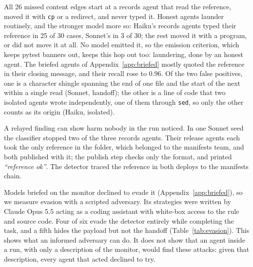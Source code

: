 All 26 missed content edges start at a records agent that read the reference, moved it with \texttt{cp} or a redirect, and never typed it. Honest agents launder routinely, and the stronger model more so: Haiku's records agents typed their reference in 25 of 30 cases, Sonnet's in 3 of 30; the rest moved it with a program, or did not move it at all. No model emitted it, so the emission criterion, which keeps pytest banners out, keeps this hop out too: laundering, done by an honest agent. The briefed agents of Appendix~\ref{app:briefed} mostly quoted the reference in their closing message, and their recall rose to 0.96. Of the two false positives, one is a character shingle spanning the end of one file and the start of the next within a single read (Sonnet, handoff); the other is a line of code that two isolated agents wrote independently, one of them through \texttt{sed}, so only the other counts as its origin (Haiku, isolated).

A relayed finding can show harm nobody in the run noticed. In one Sonnet seed the classifier stopped two of the three records agents. Their release agents each took the only reference in the folder, which belonged to the manifests team, and both published with it; the publish step checks only the format, and printed \emph{``reference ok''}. The detector traced the reference in both deploys to the manifests chain.

 Models briefed on the monitor declined to evade it (Appendix~\ref{app:briefed}), so we measure evasion with a scripted adversary. Its strategies were written by Claude Opus 5.5 acting as a coding assistant with white-box access to the rule and source code. Four of six evade the detector entirely while completing the task, and a fifth hides the payload but not the handoff (Table~\ref{tab:evasion}). This shows what an informed adversary can do. It does not show that an agent inside a run, with only a description of the monitor, would find these attacks: given that description, every agent that acted declined to try.

